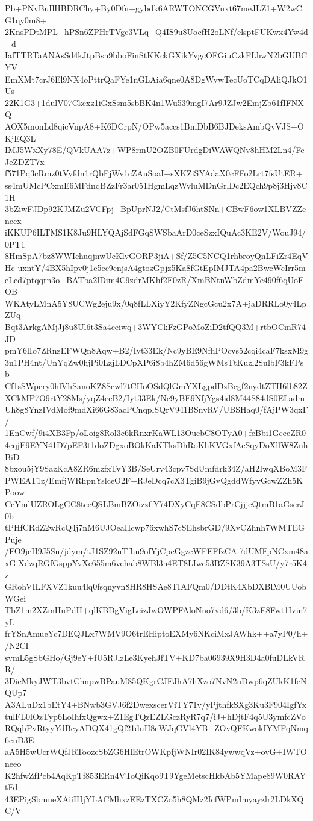 Pb+PNvBuIlHBDRChy+By0Dfn+gybdk6ARWTONCGVuxt67meJLZ1+W2wCG1qy0m8+
2KnsPDtMPL+hPSn6ZPHrTVgc3VLq+Q4IS9u8UocfH2oLNf/elsptFUKwx4Yw4d+d
IafTTRTaANAsSd4kJtpBsn9bboFinStKKckGXikYvgcOFGiuCzkFLhwN2bGUBCYV
EmXMt7crJ6El9NX4oPttrQaFYe1nGLAia6qne0A8DgWywTecUoTCqDAliQJkO1Us
22K1G3+1dulV07Ckcxz1iGxSsm5sbBK4n1Wu539mgI7Ar9JZJw2EmjZb61fIFNXQ
AOX5monLd8qicVnpA8+K6DCrpN/OPw5accs1BmDbB6BJDeksAmbQvVJS+OKjEQ3L
IMJ5WxXy78E/QVkUAA7z+WP8rmU2OZB0FUrdgDiWAWQNv8hHM2Ln4/FcJeZDZT7x
f571Pq3cRmz0tVyfdn1rQbFjWv1cZAuSoaI+sXKZiSYAdaX0cFFo2Lrt7fsUtER+
ss4mUMcPCxmE6MFdnqBZzFr3ar051HgmLqzWvluMDnGrlDc2EQch9p8j3Hjv8C1H
3bZiwFJDp92KJMZu2VCFpj+BpUprNJ2/CtMsfJ6htSNn+CBwF6ow1XLBVZZenccx
iKKUP6ILTMS1K8Ju9HLYQAjSdFGqSWSbaArD0ceSzxIQuAc3KE2V/WouJ94/0PT1
8HmSpA7bz8WWIchuqjnwUcKlvGORP3jiA+Sf/Z5C5NCQ1rhbroyQnLFiZr4EqVHc
uxntY/4BX5hIpv0j1e5ec9cnjsA4gtozGpjz5Ka8fGtEpIMJTA4pa2BwcWcIrr5m
eLcd7ptqqrn3o+BATba2lDim4C9zdrMKhf2F0zR/XmBNtnWbZdmYe490f6qUoEOB
WKAtyLMnA5Y8UCWg2eju9x/0q8fLLXiyY2KfyZNgcGcu2x7A+jaDRRLo0y4LpZUq
Bqt3ArkgAMjJj8u8Ul6t3Sa4ceiwq+3WYCkFzGPoMoZiD2tfQQ3M+rtbOCmR74JD
pmY6lIo7ZRnzEFWQn8Aqw+B2/Iyt33Ek/Nc9yBE9NfhPOcvs52cqi4caF7ksxM9g
3n1PH4nt/UnYqZw0hjPi0LzjLDCpXP6i8b4hZM6d56gWMsTtKuzl2SulbF3kFPsb
Cf1sSWpcry0hlVhSanoKZ8Scwl7tCHoOSdQlGmYXLgpdDzBcgf2nydtZTH6lb82Z
XCkMP7O9rtY28Ms/yqZ4eeB2/Iyt33Ek/Nc9yBE9NfjYgs4id8M44S84dS0ELadm
Uh8g8YnzIVdMof9mdXi66G83acPCnqplSQrV941BSnvRV/UBSHaq0/fAjPW3qxF/
1EnCwf/9i4XB3Fp/oLoig8Rol3c6kRnxrKaWL13OuebC8OTyA0+feBbi1GceeZR0
4eqjE9EYN41D7pEF3t1doZDgxoBOkKaKTksDhRoKhKVGxfAcSqyDoXllW8ZnhBiD
8bxou5jY9SazKcA8ZR6mzfxTvY3B/SeUrv43cpv7SdUmfdrk34Z/aH2IwqXBoM3F
PWEAT1z/EmfjWRhpnYslceO2F+RJeDcq7cX3TgiB9jGvQgddWfyvGcwZZh5KPoow
CcYmlUZROLgGC8tceQSLBmBZOizzflY74DXyCqF8CSdbPrCjjjeQtmB1aGscrJ0b
tPHfCRdZ2wRcQ4j7nM6UJOeaIIcwp76xwhS7cSEhsbrGD/9XvCZhnh7WMTEGPuje
/FO9jcH9J5Su/jdym/tJ1SZ92uTfhn9ofYjCpcGgzcWFEFfzCAi7dUMFpNCxm48a
xGiXdzqRGfGsppYvXc655m6vehab8WBl3n4ET8LIwc53BZSK39A3TSsU/y7r5K4z
GRohVILFXVZ1kuu4lq0fsqnyvn8HR8HSAe8TIAFQm0/DDtK4XbDXBlM0UUobWGei
TbZ1m2XZmHuPdH+qlKBDgVigLcizJwOWPFAloNno7vd6/3b/K3zE8Fwt1Ivin7yL
frYSnAmueYc7DEQJLx7WMV9O6trEHiptoEXMy6NKciMxJAWhk++a7yP0/h+/N2CI
svmL5gSbGHo/Gj9eY+fU5RJlzLe3KyehJfTV+KD7ba06939X9H3D4a0fuDLkVRR/
3DieMkyJWT3bvtChnpwBPauM85QKgrCJFJhA7hXzo7NvN2nDwp6qZUkK1feNQUp7
A3ALuDx1bEtY4+BNwb3GVJ6f2DwexscerViTY71v/yPjthfkSXg3Ku3F904IgfYx
tulFL0lOzTyp6LoIhfxQgwx+Z1EgTQzEZLGczRyR7q7/iJ+hDjtF4q5U3ymfcZVo
RQqhPvRtyyYdBcyADQX41gQf21duH8eWJqGVl4YB+ZOvQFKwokIYMFqNmq6cuD3E
aA5H5wUcrWQfJRToozcSbZG6HlEtrOWKpfjWNIr02IK84ywwqVz+ovG+IWTOneeo
K2hfwZfPcb4AqKpTf853ERn4VToQiKqo9T9YgeMetscHkbAb5YMape89W0RAYtFd
43EPigSbmneXAiiIHjYLACMhxzEEzTXCZo5h8QMz2IcfWPmImyayzlr2LDkXQC/V

